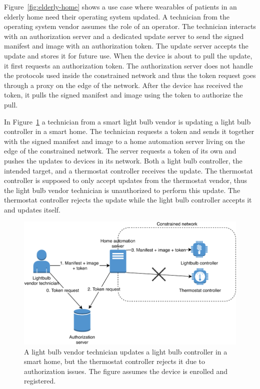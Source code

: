 \documentclass[0-thesis.tex]{subfiles}
\begin{document}
Figure~\ref{fig:elderly-home} shows a use case where wearables of patients in an elderly
home need their operating system updated. A technician from the operating system vendor
assumes the role of an operator. The technician interacts with an authorization server and
a dedicated update server to send the signed manifest and image with an authorization
token. The update server accepts the update and stores it for future use. When the device
is about to pull the update, it first requests an authorization token. The authorization
server does not handle the protocols used inside the constrained network and thus the
token request goes through a proxy on the edge of the network. After the device has
received the token, it pulls the signed manifest and image using the token to authorize
the pull.

In Figure~\ref{fig:smart-home} a technician from a smart light bulb vendor is updating a
light bulb controller in a smart home. The technician requests a token and sends it
together with the signed manifest and image to a home automation server living on the edge
of the constrained network. The server requests a token of its own and pushes the updates
to devices in its network. Both a light bulb controller, the intended target, and a
thermostat controller receives the update. The thermostat controller is supposed to only
accept updates from the thermostat vendor, thus the light bulb vendor technician is
unauthorized to perform this update. The thermostat controller rejects the update while
the light bulb controller accepts it and updates itself.

\begin{figure}[t]
    \caption{A light bulb vendor technician updates a light bulb controller in a smart
                home, but the thermostat controller rejects it due to authorization
                issues. The figure assumes the device is enrolled and registered.}
    \label{fig:smart-home}
    \includegraphics{images/use-case-smart-home.pdf}
\end{figure}
\end{document}
